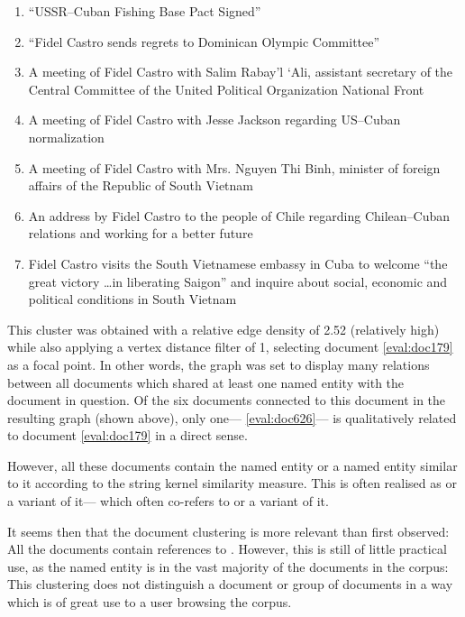 \begin{enumerate}
\item ``USSR--Cuban Fishing Base Pact Signed''\label{eval:doc179}
\item ``Fidel Castro sends regrets to Dominican Olympic Committee''\label{eval:doc553}
\item A meeting of Fidel Castro with Salim Rabay'l `Ali, assistant secretary of the Central Committee of the United Political Organization National Front\label{eval:doc682}
\item A meeting of Fidel Castro with Jesse Jackson regarding US--Cuban normalization\label{eval:doc879}
\item A meeting of Fidel Castro with Mrs. Nguyen Thi Binh, minister of foreign affairs of the Republic of South Vietnam\label{eval:doc643}
\item An address by Fidel Castro to the people of Chile regarding Chilean--Cuban relations and working for a better future\label{eval:doc391}
\item Fidel Castro visits the South Vietnamese embassy in Cuba to welcome ``the great victory \ldots in liberating Saigon'' and inquire about social, economic and political conditions in South Vietnam\label{eval:doc626}
\end{enumerate} 

This cluster was obtained with a relative edge density of 2.52 (relatively high) while also applying a vertex distance filter of 1, selecting document \ref{eval:doc179} as a focal point. In other words, the graph was set to display many relations between all documents which shared at least one named entity with the document in question. Of the six documents connected to this document in the resulting graph (shown above), only one--- \ref{eval:doc626}--- is qualitatively related to document \ref{eval:doc179} in a direct sense.

However, all these documents contain the named entity  or a named entity similar to it according to the string kernel similarity measure. This is often realised as  or a variant of it--- which often co-refers to  or a variant of it.

It seems then that the document clustering is more relevant than first observed: All the documents contain references to . However, this is still of little practical use, as the named entity  is in the vast majority of the documents in the corpus: This clustering does not distinguish a document or group of documents in a way which is of great use to a user browsing the corpus.

